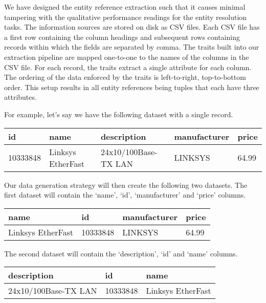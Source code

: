 \documentclass[11pt]{article}
\begin{document}
    We have designed the entity reference extraction such that it causes minimal
    tampering with the qualitative performance readings for the entity
    resolution tasks.
    The information sources are stored on disk as CSV files.
    Each CSV file has a first row containing the column headings and subsequent
    rows containing records within which the fields are separated by comma.
    The traits built into our extraction pipeline are mapped one-to-one to the
    names of the columns in the CSV file.
    For each record, the traits extract a single attribute for each column.
    The ordering of the data enforced by the traits is left-to-right,
    top-to-bottom order.
    This setup results in all entity references being tuples that each have
    three attributes.

    For example, let's say we have the following dataset with a single record.
    \begin{center}
        \begin{tabular}[b]{|l|l|l|l|l|}
            \hline
            id&name&description&manufacturer&price\\
            \hline
            10333848&Linksys EtherFast&24x10/100Base-TX LAN&LINKSYS&64.99 \\
            \hline
        \end{tabular}
    \end{center}

    Our data generation strategy will then create the following two datasets.
    The first dataset will contain the `name', `id', `manufacturer' and `price'
    columns.
    
    \begin{center}
        \begin{tabular}[b]{|l|l|l|l|}
            \hline
            name&id&manufacturer&price \\
            \hline
            Linksys EtherFast&10333848&LINKSYS&64.99 \\
            \hline
        \end{tabular}
    \end{center}

    The second dataset will contain the `description', `id' and `name' columns.

    \begin{center}
        \begin{tabular}[b]{|l|l|l|}
            \hline
            description&id&name \\
            \hline
            24x10/100Base-TX LAN&10333848&Linksys EtherFast \\
            \hline
        \end{tabular}
    \end{center}
\end{document}
